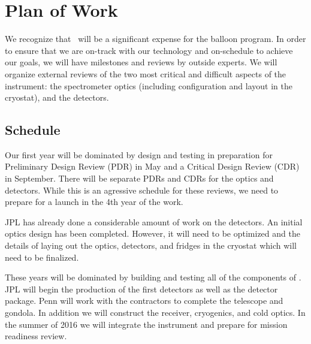 \section{Plan of Work}

We recognize that \name\ will be a significant expense for the
balloon program.  In order to ensure that we are on-track with our
technology and on-schedule to achieve our goals, we will have
milestones and reviews by outside experts.  We will organize external
reviews of the two most critical and difficult aspects of the
instrument: the spectrometer optics (including configuration and
layout in the cryostat), and the detectors.

\subsection{Schedule}

 Our first year will be
dominated by design and testing in preparation for Preliminary Design
Review (PDR) in May and a Critical Design Review (CDR) in September.
There will be separate PDRs and CDRs for the optics and detectors.
While this is an agressive schedule for these reviews, we need to
prepare for a launch in the 4th year of the work.

JPL has already done a considerable amount of work on the detectors.
An initial optics design has been completed. However, it will need to
be optimized and the details of laying out the optics, detectors, and
fridges in the cryostat which will need to be finalized.


 These years will be
dominated by building and testing all of the components of \name.
JPL will begin the production of the first detectors as well as the
detector package.  Penn will work with the contractors to complete the
telescope and gondola.  In addition we will construct the receiver,
cryogenics, and cold optics.  In the summer of 2016 we will integrate
the instrument and prepare for mission readiness review.

